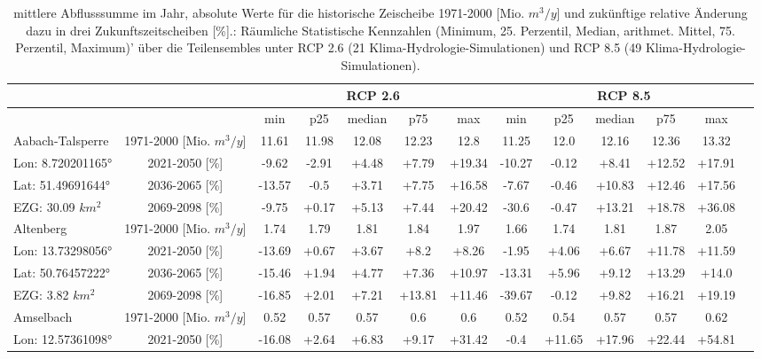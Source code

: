 \renewcommand{\arraystretch}{1.2}
\addtolength{\tabcolsep}{-5.9pt}
\scriptsize
\begin{longtable}{@{\extracolsep{\fill}}lc|ccccc||cccccc}
\caption{mittlere Abflusssumme im Jahr, absolute Werte für die historische Zeischeibe 1971-2000 [Mio. $m^3/y$] und zukünftige relative Änderung dazu in drei Zukunftszeitscheiben [\%].: Räumliche Statistische Kennzahlen (Minimum, 25. Perzentil, Median, arithmet. Mittel, 75. Perzentil, Maximum)' über die Teilensembles unter RCP 2.6 (21 Klima-Hydrologie-Simulationen) und RCP 8.5 (49 Klima-Hydrologie-Simulationen).}\\  \hline
\multicolumn{2}{c}{} & \multicolumn{5}{c||}{RCP 2.6}  & \multicolumn{6}{c}{RCP 8.5}\\ \hline
\multicolumn{2}{c|}{} & min & p25 & median & p75 & max & min & p25 & median & p75 & max\\ 
\hline 
Aabach-Talsperre & 1971-2000 [Mio. $m^3/y$]  & 11.61 & 11.98 & 12.08 & 12.23 & 12.8 & 11.25 & 12.0 & 12.16 & 12.36 & 13.32 & \\ 
\cline{2-13} 
Lon: 8.720201165° & 2021-2050 [\%]  & -9.62 & -2.91 & +4.48 & +7.79 & +19.34 & -10.27 & -0.12 & +8.41 & +12.52 & +17.91 & \\ 
Lat: 51.49691644° & 2036-2065 [\%]  & -13.57 & -0.5 & +3.71 & +7.75 & +16.58 & -7.67 & -0.46 & +10.83 & +12.46 & +17.56 & \\ 
EZG: 30.09 $km^2$ & 2069-2098 [\%]  & -9.75 & +0.17 & +5.13 & +7.44 & +20.42 & -30.6 & -0.47 & +13.21 & +18.78 & +36.08 & \\ 
\hline 
Altenberg & 1971-2000 [Mio. $m^3/y$]  & 1.74 & 1.79 & 1.81 & 1.84 & 1.97 & 1.66 & 1.74 & 1.81 & 1.87 & 2.05 & \\ 
\cline{2-13} 
Lon: 13.73298056° & 2021-2050 [\%]  & -13.69 & +0.67 & +3.67 & +8.2 & +8.26 & -1.95 & +4.06 & +6.67 & +11.78 & +11.59 & \\ 
Lat: 50.76457222° & 2036-2065 [\%]  & -15.46 & +1.94 & +4.77 & +7.36 & +10.97 & -13.31 & +5.96 & +9.12 & +13.29 & +14.0 & \\ 
EZG: 3.82 $km^2$ & 2069-2098 [\%]  & -16.85 & +2.01 & +7.21 & +13.81 & +11.46 & -39.67 & -0.12 & +9.82 & +16.21 & +19.19 & \\ 
\hline 
Amselbach & 1971-2000 [Mio. $m^3/y$]  & 0.52 & 0.57 & 0.57 & 0.6 & 0.6 & 0.52 & 0.54 & 0.57 & 0.57 & 0.62 & \\ 
\cline{2-13} 
Lon: 12.57361098° & 2021-2050 [\%]  & -16.08 & +2.64 & +6.83 & +9.17 & +31.42 & -0.4 & +11.65 & +17.96 & +22.44 & +54.81 & \\ 

\end{longtable}
